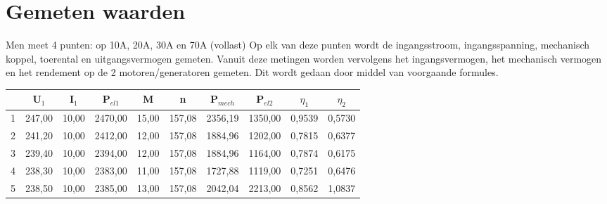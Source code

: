 \section{Gemeten waarden}

Men meet 4 punten: op 10A, 20A, 30A en 70A (vollast)
Op elk van deze punten wordt de ingangsstroom, ingangsspanning, mechanisch koppel,
toerental en uitgangsvermogen gemeten.
Vanuit deze metingen worden vervolgens het ingangsvermogen, het mechanisch vermogen
en het rendement op de 2 motoren/generatoren gemeten. Dit wordt gedaan door middel van
voorgaande formules.

\begin{tabular}{| c | c | c | c | c | c | c | c | c | c |}
    \hline
      & U$_1$  & I$_1$ & P$_{el1}$ & M     & n      & P$_{mech}$& P$_{el2}$ &$\eta_1$&$\eta_2$\\ \hline
    1 & 247,00 & 10,00 & 2470,00 & 15,00 & 157,08 & 2356,19 & 1350,00 & 0,9539 & 0,5730 \\ \hline
    2 & 241,20 & 10,00 & 2412,00 & 12,00 & 157,08 & 1884,96 & 1202,00 & 0,7815 & 0,6377 \\ \hline
    3 & 239,40 & 10,00 & 2394,00 & 12,00 & 157,08 & 1884,96 & 1164,00 & 0,7874 & 0,6175 \\ \hline
    4 & 238,30 & 10,00 & 2383,00 & 11,00 & 157,08 & 1727,88 & 1119,00 & 0,7251 & 0,6476 \\ \hline
    5 & 238,50 & 10,00 & 2385,00 & 13,00 & 157,08 & 2042,04 & 2213,00 & 0,8562 & 1,0837 \\ \hline
\end{tabular}

